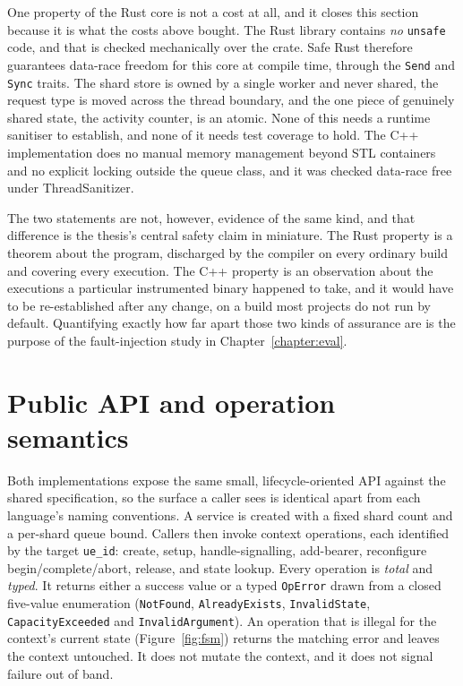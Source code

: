 \documentclass[english,oneside,a4paper,censored,csm,software-track-2020]{HYthesisML}
\begin{document}
One property of the Rust core is not a cost at all, and it closes this section because it is what
the costs above bought. The Rust library contains \emph{no} \texttt{unsafe} code, and that is
checked mechanically over the crate. Safe Rust therefore guarantees data-race freedom for this core at
compile time, through the \texttt{Send} and \texttt{Sync} traits. The shard store is owned by a
single worker and never shared, the request type is moved across the thread boundary, and the
one piece of genuinely shared state, the activity counter, is an atomic. None of this needs a
runtime sanitiser to establish, and none of it needs test coverage to hold. The C++
implementation does no manual memory management beyond STL containers and no explicit
locking outside the queue class, and it was checked data-race free under ThreadSanitizer.

The two statements are not, however, evidence of the same kind, and that difference is the
thesis's central safety claim in miniature. The Rust property is a theorem about the program,
discharged by the compiler on every ordinary build and covering every execution. The C++
property is an observation about the executions a particular instrumented binary happened to
take, and it would have to be re-established after any change, on a build most projects do not
run by default. Quantifying exactly how far apart those two kinds of assurance are is the
purpose of the fault-injection study in Chapter~\ref{chapter:eval}.

\section{Public API and operation semantics}
Both implementations expose the same small, lifecycle-oriented API against the shared
specification, so the surface a caller sees is identical apart from each language's naming
conventions. A service is created with a fixed shard count and a per-shard queue bound.
Callers then invoke context operations, each identified by the target \texttt{ue\_id}: create,
setup, handle-signalling, add-bearer, reconfigure begin/complete/abort, release, and state
lookup. Every operation is \emph{total} and \emph{typed}. It returns either a success value or
a typed \texttt{OpError} drawn from a closed five-value enumeration (\texttt{NotFound},
\texttt{AlreadyExists}, \texttt{InvalidState}, \texttt{CapacityExceeded} and
\texttt{InvalidArgument}). An operation that is illegal for the context's
current state (Figure~\ref{fig:fsm}) returns the matching error and leaves the context
untouched. It does not mutate the context, and it does not signal failure out of band.
\end{document}
